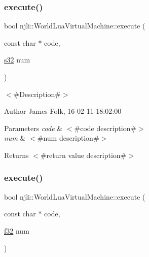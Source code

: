 \subsubsection{\texorpdfstring{execute()}{execute()}\hspace{0.1cm}{\footnotesize\ttfamily [3/33]}}
{\footnotesize\ttfamily bool njli\+::\+World\+Lua\+Virtual\+Machine\+::execute (\begin{DoxyParamCaption}\item[{const char $\ast$}]{code,  }\item[{\mbox{\hyperlink{_util_8h_aa62c75d314a0d1f37f79c4b73b2292e2}{s32}}}]{num }\end{DoxyParamCaption})}



$<$\#\+Description\#$>$ 

\begin{DoxyAuthor}{Author}
James Folk, 16-\/02-\/11 18\+:02\+:00
\end{DoxyAuthor}

\begin{DoxyParams}{Parameters}
{\em code} & $<$\#code description\#$>$ \\
\hline
{\em num} & $<$\#num description\#$>$\\
\hline
\end{DoxyParams}
\begin{DoxyReturn}{Returns}
$<$\#return value description\#$>$ 
\end{DoxyReturn}
\mbox{\label{classnjli_1_1_world_lua_virtual_machine_a8e4cfb46cfc326f39c95f87abf1ed570}} 
\subsubsection{\texorpdfstring{execute()}{execute()}\hspace{0.1cm}{\footnotesize\ttfamily [4/33]}}
{\footnotesize\ttfamily bool njli\+::\+World\+Lua\+Virtual\+Machine\+::execute (\begin{DoxyParamCaption}\item[{const char $\ast$}]{code,  }\item[{\mbox{\hyperlink{_util_8h_a5f6906312a689f27d70e9d086649d3fd}{f32}}}]{num }\end{DoxyParamCaption})}




